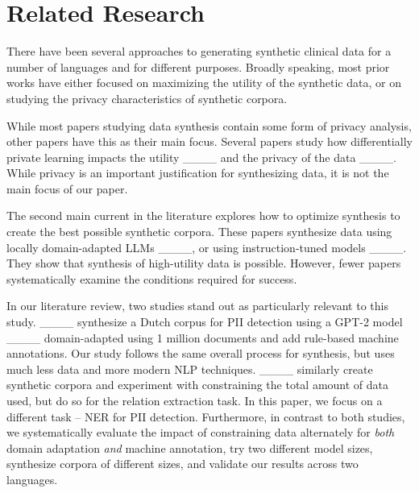 \section{Related Research}
There have been several approaches to generating synthetic clinical data for a number of languages and for different purposes. Broadly speaking, most prior works have either focused on maximizing the utility of the synthetic data, or on studying the privacy characteristics of synthetic corpora.

While most papers studying data synthesis contain some form of privacy analysis, other papers have this as their main focus. Several papers study how differentially private learning impacts the utility ____ and the privacy of the data ____. While privacy is an important justification for synthesizing data, it is not the main focus of our paper.

The second main current in the literature explores how to optimize synthesis to create the best possible synthetic corpora. These papers synthesize data using locally domain-adapted LLMs ____, or using instruction-tuned models ____. They show that synthesis of high-utility data is possible. However, fewer papers systematically examine the conditions required for success.

In our literature review, two studies stand out as particularly relevant to this study. ____ synthesize a Dutch corpus for PII detection using a GPT-2 model ____ domain-adapted using 1 million documents and add rule-based machine annotations. Our study follows the same overall process for synthesis, but uses much less data and more modern NLP techniques. ____ similarly create synthetic corpora and experiment with constraining the total amount of data used, but do so for the relation extraction task. In this paper, we focus on a different task -- NER for PII detection. Furthermore, in contrast to both studies, we systematically evaluate the impact of constraining data alternately for \textit{both} domain adaptation \textit{and} machine annotation, try two different model sizes, synthesize corpora of different sizes, and validate our results across two languages.